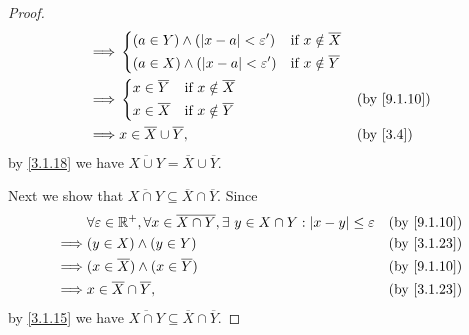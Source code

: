 \begin{proof}
\begin{align*}
    \implies & \begin{dcases}
                 (a \in Y) \land (\abs{x - a} < \varepsilon') & \text{if } x \notin \overline{X} \\
                 (a \in X) \land (\abs{x - a} < \varepsilon') & \text{if } x \notin \overline{Y}
               \end{dcases}                                                                        \\
    \implies & \begin{dcases}
                 x \in \overline{Y} & \text{if } x \notin \overline{X} \\
                 x \in \overline{X} & \text{if } x \notin \overline{Y}
               \end{dcases}                                                                &  & \text{(by \cref{9.1.10})}                                             \\
    \implies & x \in \overline{X} \cup \overline{Y},                                                                                   &  & \text{(by \cref{3.4})}
  \end{align*}
  by \cref{3.1.18} we have \(\overline{X \cup Y} = \overline{X} \cup \overline{Y}\).

  Next we show that \(\overline{X \cap Y} \subseteq \overline{X} \cap \overline{Y}\).
  Since
  \begin{align*}
             & \forall \varepsilon \in \R^+, \forall x \in \overline{X \cap Y}, \exists\ y \in X \cap Y : \abs{x - y} \leq \varepsilon &  & \text{(by \cref{9.1.10})} \\
    \implies & (y \in X) \land (y \in Y)                                                                                               &  & \text{(by \cref{3.1.23})} \\
    \implies & (x \in \overline{X}) \land (x \in \overline{Y})                                                                         &  & \text{(by \cref{9.1.10})} \\
    \implies & x \in \overline{X} \cap \overline{Y},                                                                                   &  & \text{(by \cref{3.1.23})}
  \end{align*}
  by \cref{3.1.15} we have \(\overline{X \cap Y} \subseteq \overline{X} \cap \overline{Y}\).


\end{proof}
